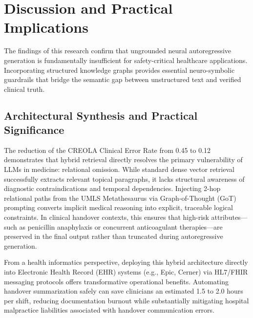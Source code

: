\documentclass[11pt, a4paper]{article}
\begin{document}
\section{Discussion and Practical Implications}
The findings of this research confirm that ungrounded neural autoregressive generation is fundamentally insufficient for safety-critical healthcare applications. Incorporating structured knowledge graphs provides essential neuro-symbolic guardrails that bridge the semantic gap between unstructured text and verified clinical truth.

\subsection{Architectural Synthesis and Practical Significance}
The reduction of the CREOLA Clinical Error Rate from 0.45 to 0.12 demonstrates that hybrid retrieval directly resolves the primary vulnerability of LLMs in medicine: relational omission. While standard dense vector retrieval successfully extracts relevant topical paragraphs, it lacks structural awareness of diagnostic contraindications and temporal dependencies. Injecting 2-hop relational paths from the UMLS Metathesaurus via Graph-of-Thought (GoT) prompting converts implicit medical reasoning into explicit, traceable logical constraints. In clinical handover contexts, this ensures that high-risk attributes—such as penicillin anaphylaxis or concurrent anticoagulant therapies—are preserved in the final output rather than truncated during autoregressive generation.

From a health informatics perspective, deploying this hybrid architecture directly into Electronic Health Record (EHR) systems (e.g., Epic, Cerner) via HL7/FHIR messaging protocols offers transformative operational benefits. Automating handover summarization safely can save clinicians an estimated 1.5 to 2.0 hours per shift, reducing documentation burnout while substantially mitigating hospital malpractice liabilities associated with handover communication errors.
\end{document}
